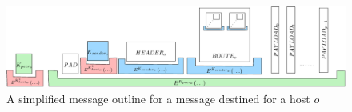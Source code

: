 \documentclass[acmsmall, screen, review]{acmart}
\begin{document}
\begin{figure}[ht]
	\centering\includegraphics[width=1.0\textwidth]{blockLayoutSimplified}
	\caption{A simplified message outline for a message destined for a host $o$}
	\label{fig:messageOutline}
\end{figure}

\end{document}
